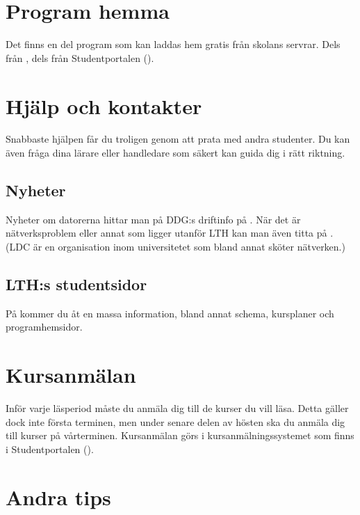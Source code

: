 \documentclass[a4paper,twocolumn]{book}
\begin{document}
\section{Program hemma}

Det finns en del program som kan laddas hem gratis från skolans servrar. Dels
från , dels från Studentportalen
().

\section{Hjälp och kontakter}

Snabbaste hjälpen får du troligen genom att prata med andra studenter. Du kan även fråga dina lärare eller handledare som säkert kan guida dig i rätt riktning.

\subsection{Nyheter}
Nyheter om datorerna hittar man på DDG:s driftinfo på
. När det är nätverksproblem eller annat som ligger
utanför LTH kan man även titta på . (LDC är en
organisation inom universitetet som bland annat sköter nätverken.)

\subsection{LTH:s studentsidor}

På  kommer du åt en massa information, bland
annat schema, kursplaner och programhemsidor.

\section{Kursanmälan}

Inför varje läsperiod måste du anmäla dig till de kurser du vill läsa. Detta
gäller dock inte första terminen, men under senare delen av hösten ska du
anmäla dig till kurser på vårterminen. Kursanmälan görs i
kursanmälningssystemet som finns i Studentportalen
().


\section{Andra tips}
\end{document}
